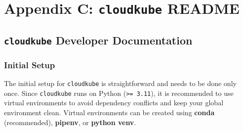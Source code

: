 \chapter{Appendix C: \texttt{cloudkube} README}
\label{appendix:cloudkube-readme}




\section*{\texttt{cloudkube} Developer Documentation}

\subsection*{Initial Setup}

The initial setup for \texttt{cloudkube} is straightforward and needs to be done only once. Since \texttt{cloudkube} runs on Python (\texttt{>= 3.11}), it is recommended to use virtual environments to avoid dependency conflicts and keep your global environment clean. Virtual environments can be created using \textbf{conda} (recommended), \textbf{pipenv}, or \textbf{python venv}.

